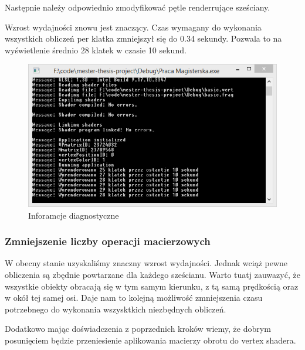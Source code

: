 

Następnie należy odpowiednio zmodyfikować pętle renderrujące sześciany.



Wzrost wydajności znowu jest znaczący. Czas wymagany do wykonania wszystkich obliczeń per klatka zmniejszył się do 0.34 sekundy. Pozwala to na wyświetlenie średnio 28 klatek w czasie 10 sekund.

\begin{figure}[h]
	\includegraphics[width=\textwidth]{images/optimized2_console}
	\caption{Inforamcje diagnostyczne}
\end{figure}


\subsubsection{Zmniejszenie liczby operacji macierzowych}
\thispagestyle{empty}
\par\indent

W obecny stanie uzyskaliśmy znaczny wzrost wydajności. Jednak wciąż pewne obliczenia są zbędnie powtarzane dla każdego sześcianu. Warto tuatj zauwazyć, że wszystkie obiekty obracają się w tym samym kierunku, z tą samą prędkością oraz w okół tej samej osi. Daje nam to kolejną możliwość zmniejszenia czasu potrzebnego do wykonania wszysktkich niezbędnych obliczeń.

Dodatkowo mając doświadczenia z poprzednich kroków wiemy, że dobrym posunięciem będzie przeniesienie aplikowania macierzy obrotu do vertex shadera.





